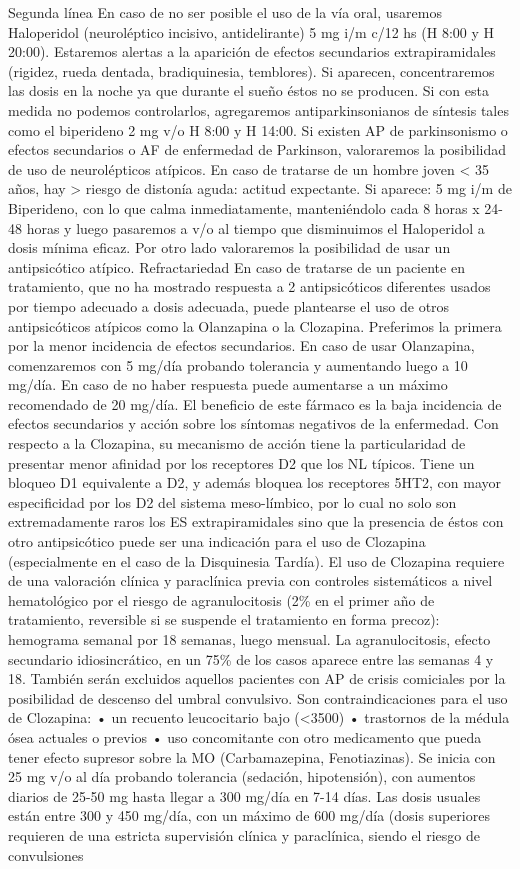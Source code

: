 Segunda línea En caso de no ser posible el uso de la vía oral, usaremos Haloperidol (neuroléptico incisivo, antidelirante) 5 mg i/m c/12 hs (H 8:00 y H 20:00). Estaremos alertas a la aparición de efectos secundarios extrapiramidales (rigidez, rueda dentada, bradiquinesia, temblores). Si aparecen, concentraremos las dosis en la noche ya que durante el sueño éstos no se producen. Si con esta medida no podemos controlarlos, agregaremos antiparkinsonianos de síntesis tales como el biperideno 2 mg v/o H 8:00 y H 14:00. Si existen AP de parkinsonismo o efectos secundarios o AF de enfermedad de Parkinson, valoraremos la posibilidad de uso de neurolépticos atípicos. En caso de tratarse de un hombre joven < 35 años, hay > riesgo de distonía aguda: actitud expectante. Si aparece: 5 mg i/m de Biperideno, con lo que calma inmediatamente, manteniéndolo cada 8 horas x 24-48 horas y luego pasaremos a v/o al tiempo que disminuimos el Haloperidol a dosis mínima eficaz. Por otro lado valoraremos la posibilidad de usar un antipsicótico atípico. Refractariedad En caso de tratarse de un paciente en tratamiento, que no ha mostrado respuesta a 2 antipsicóticos diferentes usados por tiempo adecuado a dosis adecuada, puede plantearse el uso de otros antipsicóticos atípicos como la Olanzapina o la Clozapina. Preferimos la primera por la menor incidencia de efectos secundarios. En caso de usar Olanzapina, comenzaremos con 5 mg/día probando tolerancia y aumentando luego a 10 mg/día. En caso de no haber respuesta puede aumentarse a un máximo recomendado de 20 mg/día. El beneficio de este fármaco es la baja incidencia de efectos secundarios y acción sobre los síntomas negativos de la enfermedad. Con respecto a la Clozapina, su mecanismo de acción tiene la particularidad de presentar menor afinidad por los receptores D2 que los NL típicos. Tiene un bloqueo D1 equivalente a D2, y además bloquea los receptores 5HT2, con mayor especificidad por los D2 del sistema meso-límbico, por lo cual no solo son extremadamente raros los ES extrapiramidales sino que la presencia de éstos con otro antipsicótico puede ser una indicación para el uso de Clozapina (especialmente en el caso de la Disquinesia Tardía). El uso de Clozapina requiere de una valoración clínica y paraclínica previa con controles sistemáticos a nivel hematológico por el riesgo de agranulocitosis (2\% en el primer año de tratamiento, reversible si se suspende el tratamiento en forma precoz): hemograma semanal por 18 semanas, luego mensual. La agranulocitosis, efecto secundario idiosincrático, en un 75\% de los casos aparece entre las semanas 4 y 18. También serán excluidos aquellos pacientes con AP de crisis comiciales por la posibilidad de descenso del umbral convulsivo. Son contraindicaciones para el uso de Clozapina: • un recuento leucocitario bajo (<3500) • trastornos de la médula ósea actuales o previos • uso concomitante con otro medicamento que pueda tener efecto supresor sobre la MO (Carbamazepina, Fenotiazinas). Se inicia con 25 mg v/o al día probando tolerancia (sedación, hipotensión), con aumentos diarios de 25-50 mg hasta llegar a 300 mg/día en 7-14 días. Las dosis usuales están entre 300 y 450 mg/día, con un máximo de 600 mg/día (dosis superiores requieren de una estricta supervisión clínica y paraclínica, siendo el riesgo de convulsiones 
